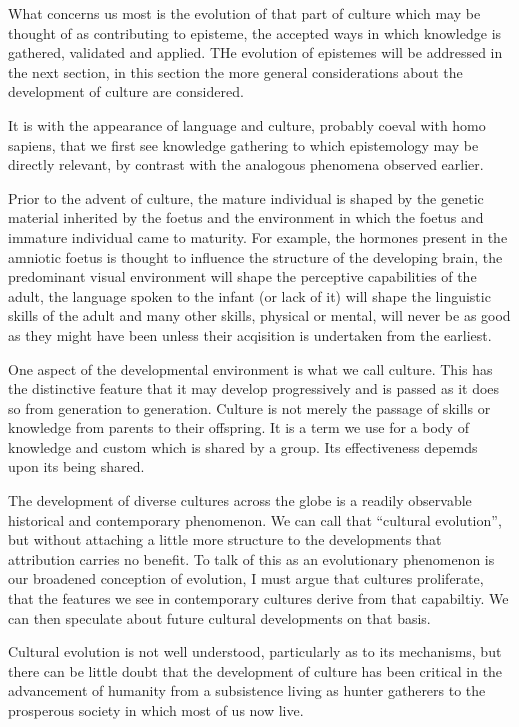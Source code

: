 What concerns us most is the evolution of that part of culture which may be thought of as contributing to episteme, the accepted ways in which knowledge is gathered, validated and applied.
THe evolution of epistemes will be addressed in the next section, in this section the more general considerations about the development of culture are considered.



It is with the appearance of language and culture, probably coeval with homo sapiens, that we first see knowledge gathering to which epistemology may be directly relevant, by contrast with the  analogous phenomena observed earlier.

Prior to the advent of culture, the mature individual is shaped by the genetic material inherited by the foetus and the environment in which the foetus and immature individual came to maturity.
For example, the hormones present in the amniotic foetus is thought to influence the structure of the developing brain, the predominant visual environment will shape the perceptive capabilities of the adult, the language spoken to the infant (or lack of it) will shape the linguistic skills of the adult and many other skills, physical or mental, will never be as good as they might have been unless their acqisition is undertaken from the earliest.

One aspect of the developmental environment is what we call culture.
This has the distinctive feature that it may develop progressively and is passed as it does so from generation to generation.
Culture is not merely the passage of skills or knowledge from parents to their offspring.
It is a term we use for a body of knowledge and custom which is shared by a group.
Its effectiveness depemds upon its being shared.


The development of diverse cultures across the globe is a readily observable historical and contemporary phenomenon.
We can call that ``cultural evolution'', but without attaching a little more structure to the developments that attribution carries no benefit.
To talk of this as an evolutionary phenomenon is our broadened conception of evolution, I must argue that cultures proliferate, that the features we see in contemporary cultures derive from that capabiltiy.
We can then speculate about future cultural developments on that basis.

Cultural evolution is not well understood, particularly as to its mechanisms, but there can be little doubt that the development of culture has been critical in the advancement of humanity from a subsistence living as hunter gatherers to the prosperous society in which most of us now live.

